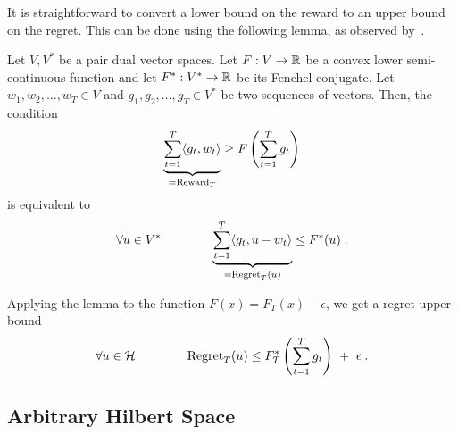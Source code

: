 It is straightforward to convert a lower bound on the reward to an upper bound
on the regret. This can be done using the following lemma, as observed
by~\cite{McMahanO14}.

\begin{lemma}
\label{lemma:reward-regret}
Let $V,V^*$ be a pair dual vector spaces. Let $F:V \to \mathbb{R}$ be a convex lower
semi-continuous function and let $F^*:V^* \to \mathbb{R}$ be its Fenchel conjugate. Let
$w_1, w_2, \dots, w_T \in V$ and $g_1, g_2, \dots, g_T \in V^*$ be two sequences
of vectors.  Then, the condition
$$
\underbrace{\sum_{t=1}^T \langle g_t, w_t \rangle}_{=\operatorname{Reward}_T} \ge F\left( \sum_{t=1}^T g_t \right)
$$
is equivalent to
$$
\forall u \in V^* \qquad \qquad
\underbrace{\sum_{t=1}^T \langle g_t, u - w_t\rangle}_{=\operatorname{Regret}_T(u)} \le F^*(u) \; .
$$
\end{lemma}

Applying the lemma to the function $F(x) = F_T(x) - \epsilon$, we get a regret
upper bound
$$
\forall u \in \mathcal{H} \qquad \qquad
\operatorname{Regret}_T(u) \le F_T^*\left(\sum_{t=1}^T g_t \right) \ + \ \epsilon \; .
$$

\subsection{Arbitrary Hilbert Space}

